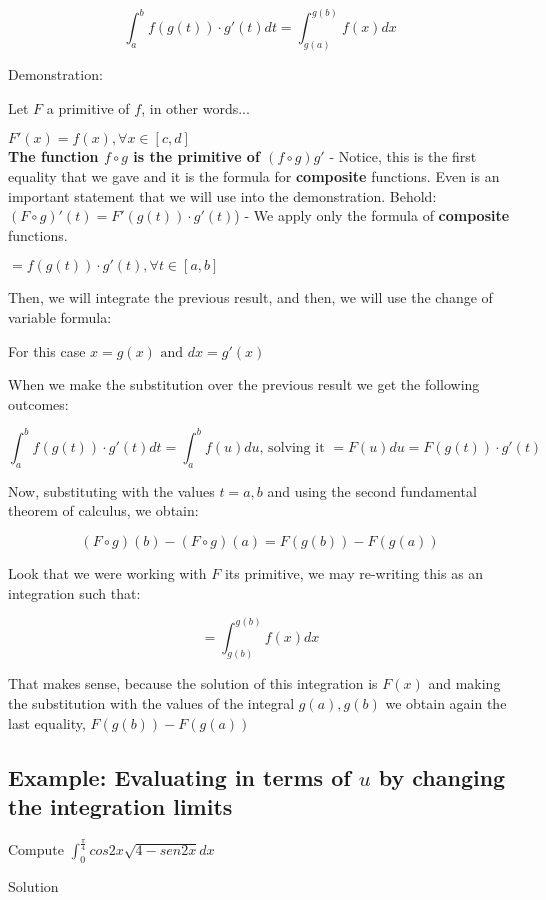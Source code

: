 \documentclass{article}
\begin{document}
\[
\int_{a}^{b}f(g(t))\cdot g'(t) dt = \int_{g(a)}^{g(b)} f(x)dx
\]

Demonstration:

Let \(F\) a primitive of \(f\), in other words...

\(F'(x) = f(x), \forall x \in [c,d]\)
\\

\textbf{The function \(f \circ g\) is the primitive of \((f\circ g) g'\)} - Notice, this is the first equality that we gave and it is the formula for \textbf{composite} functions. Even is an important statement that we will use into the demonstration. Behold:
\\

\((F \circ g)'(t) = F'(g(t))\cdot g'(t)\)) - We apply only the formula of \textbf{composite} functions.

    \(= f(g(t))\cdot g'(t), \forall t \in [a,b]\)

Then, we will integrate the previous result, and then, we will use the change of variable formula:

For this case \(x=g(x) \text{ and } dx = g'(x)\)

When we make the substitution over the previous result we get the following outcomes:

\[
\int_{a}^{b} f(g(t))\cdot g'(t)dt = \int_{a}^{b} f(u) du \text{, solving it } = F(u) du = F(g(t))\cdot g'(t)
\]

Now, substituting with the values \(t= a,b\) and using the second fundamental theorem of calculus, we obtain:

\[(F\circ g)(b) - (F \circ g) (a) = F(g(b)) - F(g(a))
\]

Look that we were working with \(F\) its primitive, we may re-writing this as an integration such that:

\[
=\int_{g(b)}^{g(b)} f(x) dx
\]

That makes sense, because the solution of this integration is \(F(x)\) and making the substitution with the values of the integral \(g(a), g(b)\) we obtain again the last equality, \(F(g(b)) - F(g(a))\)

\subsection*{Example: Evaluating in terms of \(u\) by changing the integration limits}

Compute \(\int_{0}^{\frac{\pi}{4}} cos2x\sqrt{4-sen2x} dx\)

Solution
\end{document}
